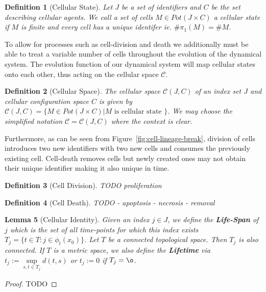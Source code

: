 \documentclass{article}
\newtheorem{definition}{Definition}[section]
\newtheorem{lemma}[definition]{Lemma}
\begin{document}
\begin{definition}[Cellular State]
    \label{def:cellular-state}
    Let $J$ be a set of identifiers and $C$ be the set describing cellular agents.
    We call a set of cells $M\in Pot(J\times C)$ a cellular state if $M$ is finite and every cell
    has a unique identifer ie. $\#\pi_1(M)=\#M$.
\end{definition}

To allow for processes such as cell-division and death we additionally must be able to treat a
variable number of cells throughout the evolution of the dynamical system.
The evolution function of our dynamical system will map cellular states onto each other, thus
acting on the cellular space $\mathscr{C}$.

\begin{definition}[Cellular Space]
    \label{def:cellular-space}
    The cellular space $\mathscr{C}(J, C)$ of an index set $J$ and cellular configuration space $C$
    is given by $\mathscr{C}(J,C) = \{M\in Pot(J\times C) | M \text{ is cellular state }\}$.
    We may choose the simplified notation $\mathscr{C} = \mathscr{C}(J, C)$ where the context is
    clear.
\end{definition}

Furthermore, as can be seen from Figure~\ref{fig:cell-lineage-break}, division of cells introduces
two new identifiers with two new cells and consumes the previously existing cell.
Cell-death removes cells but newly created ones may not obtain their unique identifier making it
also unique in time.

\begin{definition}[Cell Division]
    TODO proliferation
\end{definition}
\begin{definition}[Cell Death]
    TODO
    - apoptosis
    - necrosis
    - removal
\end{definition}

\begin{lemma}[Cellular Identity]
    \label{thm:cellular-uniqueness}
    Given an index $j\in J$, we define the \textbf{Life-Span} of $j$ which is the set of all
    time-points for which this index exists $T_j=\{t\in T: j\in\phi_t(x_0)\}$.
    Let $T$ be a connected topological space.
    Then $T_j$ is also connected.
    If $T$ is a metric space, we also define the \textbf{Lifetime} via
    $t_j:=\sup\limits_{s,t\in T_j}d(t, s)$ or $t_j:=0$ if $T_j=\o$.
\end{lemma}
\begin{proof}
    TODO
\end{proof}
\end{document}
